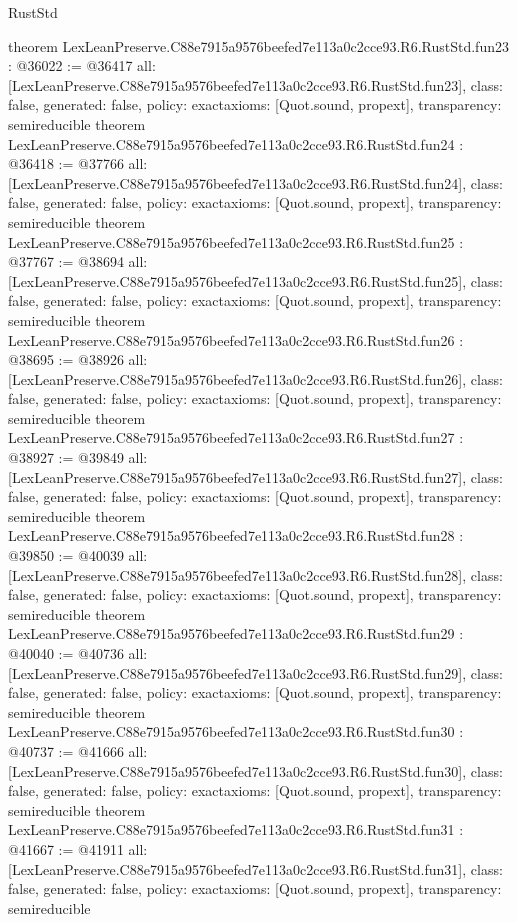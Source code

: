\begin{lexlean}{RustStd}
\begin{coremodule}
{}
theorem LexLeanPreserve.C88e7915a9576beefed7e113a0c2cce93.R6.RustStd.fun23 : @36022 := @36417 {
  all: [LexLeanPreserve.C88e7915a9576beefed7e113a0c2cce93.R6.RustStd.fun23],
  class: false,
  generated: false,
  policy: exact{axioms: [Quot.sound, propext]},
  transparency: semireducible
}
theorem LexLeanPreserve.C88e7915a9576beefed7e113a0c2cce93.R6.RustStd.fun24 : @36418 := @37766 {
  all: [LexLeanPreserve.C88e7915a9576beefed7e113a0c2cce93.R6.RustStd.fun24],
  class: false,
  generated: false,
  policy: exact{axioms: [Quot.sound, propext]},
  transparency: semireducible
}
theorem LexLeanPreserve.C88e7915a9576beefed7e113a0c2cce93.R6.RustStd.fun25 : @37767 := @38694 {
  all: [LexLeanPreserve.C88e7915a9576beefed7e113a0c2cce93.R6.RustStd.fun25],
  class: false,
  generated: false,
  policy: exact{axioms: [Quot.sound, propext]},
  transparency: semireducible
}
theorem LexLeanPreserve.C88e7915a9576beefed7e113a0c2cce93.R6.RustStd.fun26 : @38695 := @38926 {
  all: [LexLeanPreserve.C88e7915a9576beefed7e113a0c2cce93.R6.RustStd.fun26],
  class: false,
  generated: false,
  policy: exact{axioms: [Quot.sound, propext]},
  transparency: semireducible
}
theorem LexLeanPreserve.C88e7915a9576beefed7e113a0c2cce93.R6.RustStd.fun27 : @38927 := @39849 {
  all: [LexLeanPreserve.C88e7915a9576beefed7e113a0c2cce93.R6.RustStd.fun27],
  class: false,
  generated: false,
  policy: exact{axioms: [Quot.sound, propext]},
  transparency: semireducible
}
theorem LexLeanPreserve.C88e7915a9576beefed7e113a0c2cce93.R6.RustStd.fun28 : @39850 := @40039 {
  all: [LexLeanPreserve.C88e7915a9576beefed7e113a0c2cce93.R6.RustStd.fun28],
  class: false,
  generated: false,
  policy: exact{axioms: [Quot.sound, propext]},
  transparency: semireducible
}
theorem LexLeanPreserve.C88e7915a9576beefed7e113a0c2cce93.R6.RustStd.fun29 : @40040 := @40736 {
  all: [LexLeanPreserve.C88e7915a9576beefed7e113a0c2cce93.R6.RustStd.fun29],
  class: false,
  generated: false,
  policy: exact{axioms: [Quot.sound, propext]},
  transparency: semireducible
}
theorem LexLeanPreserve.C88e7915a9576beefed7e113a0c2cce93.R6.RustStd.fun30 : @40737 := @41666 {
  all: [LexLeanPreserve.C88e7915a9576beefed7e113a0c2cce93.R6.RustStd.fun30],
  class: false,
  generated: false,
  policy: exact{axioms: [Quot.sound, propext]},
  transparency: semireducible
}
theorem LexLeanPreserve.C88e7915a9576beefed7e113a0c2cce93.R6.RustStd.fun31 : @41667 := @41911 {
  all: [LexLeanPreserve.C88e7915a9576beefed7e113a0c2cce93.R6.RustStd.fun31],
  class: false,
  generated: false,
  policy: exact{axioms: [Quot.sound, propext]},
  transparency: semireducible
}
\end{coremodule}
\end{lexlean}
